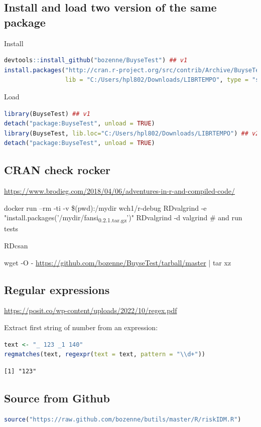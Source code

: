 \documentclass{article}
\begin{document}
\subsection{Install and load two version of the same package}
\label{sec:orga46a558}

Install
\begin{lstlisting}[language=r,numbers=none]
devtools::install_github("bozenne/BuyseTest") ## v1
install.packages("http://cran.r-project.org/src/contrib/Archive/BuyseTest/BuyseTest_1.0.tar.gz", 
                 lib = "C:/Users/hpl802/Downloads/LIBRTEMPO", type = "source", repos = NULL)
\end{lstlisting}

Load 
\begin{lstlisting}[language=r,numbers=none]
library(BuyseTest) ## v1
detach("package:BuyseTest", unload = TRUE)
library(BuyseTest, lib.loc="C:/Users/hpl802/Downloads/LIBRTEMPO") ## v2
detach("package:BuyseTest", unload = TRUE)
\end{lstlisting}
\subsection{CRAN check rocker}
\label{sec:org2d6ec5f}
\url{https://www.brodieg.com/2018/04/06/adventures-in-r-and-compiled-code/}

docker run --rm -ti -v \$(pwd):/mydir wch1/r-debug
RDvalgrind -e "install.packages('/mydir/fansi\textsubscript{0.2.1.tar.gz}')"
RDvalgrind -d valgrind  \# and run tests

RDcsan

wget -O - \url{https://github.com/bozenne/BuyseTest/tarball/master} | tar xz
\subsection{Regular expressions}
\label{sec:orgbc3e7ed}
\url{https://posit.co/wp-content/uploads/2022/10/regex.pdf}

Extract first string of number from an expression:
\begin{lstlisting}[language=r,numbers=none]
text <- "_ 123 _1 140"
regmatches(text, regexpr(text = text, pattern = "\\d+"))
\end{lstlisting}

\label{}
\begin{verbatim}
[1] "123"
\end{verbatim}
\subsection{Source from Github}
\label{sec:org2e9cf73}
\begin{lstlisting}[language=r,numbers=none]
source("https://raw.github.com/bozenne/butils/master/R/riskIDM.R")
\end{lstlisting}
\end{document}
